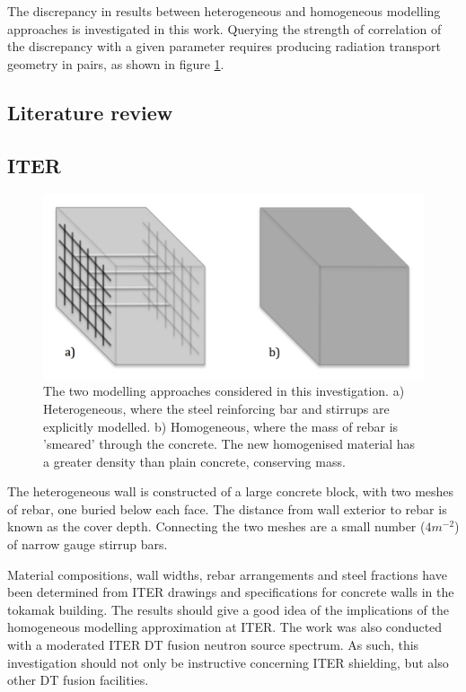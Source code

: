 The discrepancy in results between heterogeneous and homogeneous modelling approaches is investigated in this work. Querying the strength of correlation of the discrepancy with a given parameter requires producing radiation transport geometry in pairs, as shown in figure \ref{fig:wall_diagram}. 

\subsection{Literature review}

\subsection{ITER}

\begin{figure}[H]
	\includegraphics[width=\textwidth]{wall_diagram}
	\caption{The two modelling approaches considered in this investigation. a) Heterogeneous, where the steel reinforcing bar and stirrups are explicitly modelled. b) Homogeneous, where the mass of rebar is 'smeared' through the concrete. The new homogenised material has a greater density than plain concrete, conserving mass.}
	\label{fig:wall_diagram}
\end{figure}

The heterogeneous wall is constructed of a large concrete block, with two meshes of rebar, one buried below each face. The distance from wall exterior to rebar is known as the cover depth. Connecting the two meshes are a small number ($4m^{-2}$) of narrow gauge stirrup bars.

Material compositions, wall widths, rebar arrangements and steel fractions have been determined from ITER drawings and specifications for concrete walls in the tokamak building. The results should give a good idea of the implications of the homogeneous modelling approximation at ITER. The work was also conducted with a moderated ITER DT fusion neutron source spectrum. As such, this investigation should not only be instructive concerning ITER shielding, but also other DT fusion facilities.

